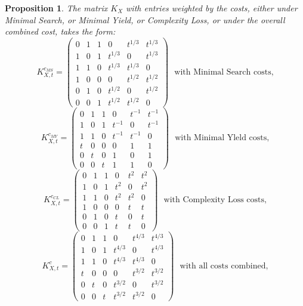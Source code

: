\documentclass[12pt]{amsart}
\newtheorem{prop}{Proposition}[section]
\numberwithin{equation}{section}
\begin{document}
\begin{prop}\label{KXcosts}
The matrix $K_X$ with entries weighted by the costs, either under
Minimal Search, or Minimal Yield, or Complexity Loss, or under the 
overall combined cost, takes the form:
\begin{equation}\label{KXms}
 K^{c_{MS}}_{X, t}= \begin{pmatrix} 0 & 1 & 1 & 0 & t^{1/3} & t^{1/3} \\
1 & 0 & 1 & t^{1/3} & 0 & t^{1/3} \\
1 & 1 & 0 & t^{1/3} & t^{1/3} & 0 \\
1 & 0 & 0 & 0 & t^{1/2} &  t^{1/2} \\
0 & 1 & 0 &  t^{1/2} & 0 &  t^{1/2} \\
0 & 0 & 1 &  t^{1/2}  &  t^{1/2} & 0 
\end{pmatrix}  \ \ \  \text{with Minimal Search costs,}
\end{equation}
\begin{equation}\label{KXmy}
 K^{c_{MY}}_{X, t}= \begin{pmatrix} 0 & 1 & 1 & 0 & t^{-1} & t^{-1} \\
1 & 0 & 1 & t^{-1} & 0 & t^{-1} \\
1 & 1 & 0 & t^{-1} & t^{-1} & 0 \\
t & 0 & 0 & 0 & 1 & 1 \\
0 & t & 0 & 1 & 0 & 1\\
0 & 0 & t & 1 & 1  & 0 
\end{pmatrix}  \ \ \  \text{with Minimal Yleld costs,}
\end{equation}
\begin{equation}\label{KXcl}
 K^{c_{CL}}_{X, t}= \begin{pmatrix} 0 & 1 & 1 & 0 & t^2 & t^2 \\
1 & 0 & 1 & t^2 & 0 & t^2 \\
1 & 1 & 0 &t^2 & t^2 & 0 \\
1 & 0 & 0 & 0 & t & t \\
0 & 1 & 0 & t & 0 & t \\
0 & 0 & 1 & t  & t & 0 
\end{pmatrix}  \ \ \  \text{with Complexity Loss costs,}
\end{equation}
\begin{equation}\label{KXc}
 K^c_{X, t}= \begin{pmatrix} 0 & 1 & 1 & 0 & t^{4/3} & t^{4/3}  \\
1 & 0 & 1 & t^{4/3}  & 0 & t^{4/3}  \\
1 & 1 & 0 & t^{4/3}  & t^{4/3}  & 0 \\
t & 0 & 0 & 0 & t^{3/2}  & t^{3/2}   \\
0 & t & 0 & t^{3/2}   & 0 & t^{3/2}   \\
0 & 0 & t & t^{3/2}   & t^{3/2}   & 0 
\end{pmatrix}  \ \ \  \text{with all costs combined,}
\end{equation}
\end{prop}
\end{document}
